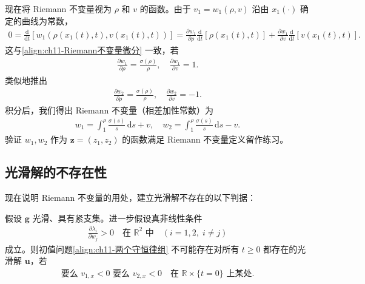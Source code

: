 \documentclass[../../main.tex]{subfiles}
\begin{document}
\begin{example}[正压可压缩气体动力学。]
现在将 Riemann 不变量视为 $\rho$ 和 $v$ 的函数。由于 $v_1=w_1(\rho,v)$ 沿由 $x_1(\cdot)$ 确定的曲线为常数，
\begin{align*}
0=\frac{\mathrm{d}}{\mathrm{d}t}[w_1(\rho(x_1(t),t),v(x_1(t),t))]=\frac{\partial w_1}{\partial\rho}\frac{\mathrm{d}}{\mathrm{d}t}[\rho(x_1(t),t)]+\frac{\partial w_1}{\partial v}\frac{\mathrm{d}}{\mathrm{d}t}[v(x_1(t),t)].
\end{align*}
这与\eqref{align:ch11-Riemann不变量微分} 一致，若
\begin{align*}
\frac{\partial w_1}{\partial\rho}=\frac{\sigma(\rho)}{\rho},\quad \frac{\partial w_1}{\partial v}=1.
\end{align*}
类似地推出
\begin{align*}
\frac{\partial w_2}{\partial\rho}=\frac{\sigma(\rho)}{\rho},\quad \frac{\partial w_2}{\partial v}=-1.
\end{align*}
积分后，我们得出 Riemann 不变量（相差加性常数）为
\begin{align*}
w_1=\int_1^\rho\frac{\sigma(s)}{s}\,\mathrm{d}s+v,\quad w_2=\int_1^\rho\frac{\sigma(s)}{s}\,\mathrm{d}s-v.
\end{align*}
验证 $w_1,w_2$ 作为 $\mathbf{z}=(z_1,z_2)$ 的函数满足 Riemann 不变量定义留作练习。
\end{example}

\subsection{光滑解的不存在性}\label{subsection:ch11-光滑解不存在}

现在说明 Riemann 不变量的用处，建立光滑解不存在的以下判据：

\begin{theorem}\label{theorem:ch11-Riemann不变量与爆破}假设 $\mathbf{g}$ 光滑、具有紧支集。进一步假设真非线性条件
\begin{align}
\frac{\partial\lambda_i}{\partial w_j}>0 \quad \text{在 } \mathbb{R}^2 \text{ 中} \quad (i=1,2,\;i\neq j)
\label{align:ch11-真非线性正}
\end{align}
成立。则初值问题\eqref{align:ch11-两个守恒律组} 不可能存在对所有 $t\geqslant 0$ 都存在的光滑解 $\mathbf{u}$，若
\begin{align}
\text{要么 } v_{1,x}<0 \text{ 要么 } v_{2,x}<0 \quad \text{在 } \mathbb{R}\times\{t=0\} \text{ 上某处}.
\label{align:ch11-爆破条件}
\end{align}
\end{theorem}
\end{document}
